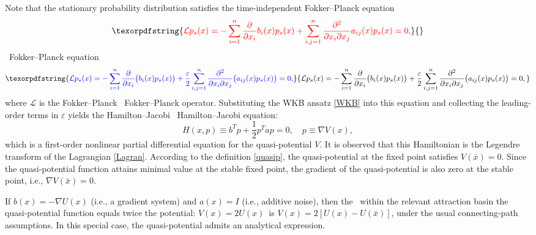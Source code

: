 \documentclass[11pt]{article}
\theoremstyle{plain}      %
\theoremstyle{definition} %
\providecommand{\DIFaddtex}[1]{{\protect\color{blue}#1}} %
\providecommand{\DIFdeltex}[1]{{\protect\color{red}#1}} %
\providecommand{\DIFaddbegin}{} %
\providecommand{\DIFaddend}{} %
\providecommand{\DIFdelbegin}{} %
\providecommand{\DIFdelend}{} %
\providecommand{\DIFadd}[1]{\texorpdfstring{\DIFaddtex{#1}}{#1}} %
\providecommand{\DIFdel}[1]{\texorpdfstring{\DIFdeltex{#1}}{}} %
\newcommand{\DIFscaledelfig}{1.0}
\newlength{\DIFdelgraphicswidth} %
\newlength{\DIFdelgraphicsheight} %
\newcommand{\DIFaddincludegraphics}[2][]{{\color{blue}\fbox{\DIFOincludegraphics[#1]{#2}}}} %
\newcommand{\DIFdelincludegraphics}[2][]{%
\sbox{\DIFdelgraphicsbox}{\DIFOincludegraphics[#1]{#2}}%
\settoboxwidth{\DIFdelgraphicswidth}{\DIFdelgraphicsbox} %
\settoboxtotalheight{\DIFdelgraphicsheight}{\DIFdelgraphicsbox} %
\scalebox{\DIFscaledelfig}{%
\parbox[b]{\DIFdelgraphicswidth}{\usebox{\DIFdelgraphicsbox}\\[-\baselineskip] \rule{\DIFdelgraphicswidth}{0em}}\llap{\resizebox{\DIFdelgraphicswidth}{\DIFdelgraphicsheight}{%
\setlength{\unitlength}{\DIFdelgraphicswidth}%
\begin{picture}(1,1)%
\thicklines\linethickness{2pt} %
{\color[rgb]{1,0,0}\put(0,0){\framebox(1,1){}}}%
{\color[rgb]{1,0,0}\put(0,0){\line( 1,1){1}}}%
{\color[rgb]{1,0,0}\put(0,1){\line(1,-1){1}}}%
\end{picture}%
}\hspace*{3pt}}} %
} %
\DeclareRobustCommand{\DIFaddbegin}{\DIFOaddbegin \let\includegraphics\DIFaddincludegraphics} %
\DeclareRobustCommand{\DIFaddend}{\DIFOaddend \let\includegraphics\DIFOincludegraphics} %
\DeclareRobustCommand{\DIFdelbegin}{\DIFOdelbegin \let\includegraphics\DIFdelincludegraphics} %
\DeclareRobustCommand{\DIFdelend}{\DIFOaddend \let\includegraphics\DIFOincludegraphics} %
\begin{document}
Note that the stationary probability distribution satisfies the time-independent \DIFdelbegin \DIFdel{Fokker–Planck equation 
}\[ \DIFdel{\mathcal{L}p_s(x) = - \sum_{i=1}^n \frac{\partial}{\partial x_i} b_i(x)p_{s}(x) + \sum_{i,j=1}^n \frac{\partial^2}{\partial x_i \partial x_j} a_{ij}(x)p_{s}(x) = 0, }\]%
\DIFdelend\ \DIFaddbegin \DIFadd{Fokker--Planck equation 
}\[ \DIFadd{\mathcal{L}p_s(x) = - \sum_{i=1}^n \frac{\partial}{\partial x_i}\bigl(b_i(x)p_{s}(x)\bigr) + \frac{\varepsilon}{2}\sum_{i,j=1}^n \frac{\partial^2}{\partial x_i \partial x_j}\bigl(a_{ij}(x)p_{s}(x)\bigr) = 0, }\]\DIFaddend 
where \( \mathcal{L} \) is the \DIFdelbegin \DIFdel{Fokker–Planck }\DIFdelend\ \DIFaddbegin \DIFadd{Fokker--Planck }\DIFaddend operator. Substituting the WKB ansatz \eqref{WKB} into this equation and collecting the leading-order terms in \( \varepsilon \) yields the \DIFdelbegin \DIFdel{Hamilton–Jacobi }\DIFdelend\ \DIFaddbegin \DIFadd{Hamilton--Jacobi }\DIFaddend equation:
\begin{equation}
\label{HJE}
H(x, p) \equiv b^{T}p + \frac{1}{2} p^{T}ap = 0, \quad p \equiv \nabla V (x),
\end{equation}
which is a first-order nonlinear partial differential equation for the quasi-potential \( V \). It is observed that this Hamiltonian is the Legendre transform of the Lagrangian \eqref{Lagran}. According to the definition \eqref{quasip}, the quasi-potential at the fixed point satisfies \( V(\bar{x}) = 0 \). Since the quasi-potential function attains minimal value at the stable fixed point, the gradient of the quasi-potential is also zero at the stable point, i.e., $\nabla V(\bar{x}) =0$.

If \( b(x) = -\nabla U(x) \) (i.e., a gradient system) and \( a(x) = I \) (i.e., additive noise), then \DIFdelbegin \DIFdel{the }\DIFdelend\ \DIFaddbegin \DIFadd{within the relevant attraction basin the }\DIFaddend quasi-potential \DIFdelbegin \DIFdel{function equals twice the potential: \( V(x) = 2U(x) \)}\DIFdelend\ \DIFaddbegin \DIFadd{is \(V(x)=2[U(x)-U(\bar x)]\), under the usual connecting-path assumptions}\DIFaddend . In this special case, the quasi-potential admits an analytical expression.
\end{document}
